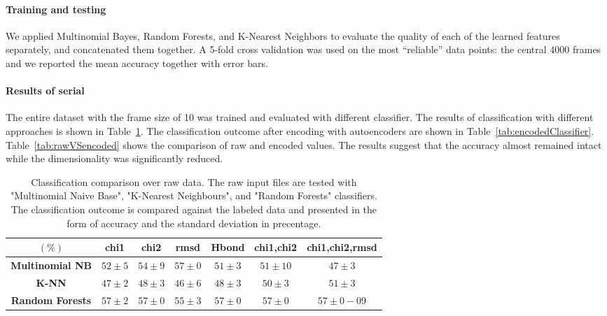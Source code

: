 \documentclass{article}
\begin{document}
\paragraph{Training and testing} We applied Multinomial Bayes, Random Forests, and K-Nearest Neighbors to evaluate the quality of each of the learned features separately, and concatenated them together. A 5-fold cross validation was used on the most “reliable” data points: the central $4000$ frames and we reported the mean accuracy together with error bars.

\paragraph{Results of serial} The entire dataset with the frame size of 10 was trained and evaluated with different classifier. The results of classification with different approaches is shown in Table~\ref{tab:rawClassifier}. The classification outcome after encoding with autoencoders are shown in Table~\ref{tab:encodedClassifier}. Table~\ref{tab:rawVSencoded} shows the comparison of raw and encoded values. The results suggest that the accuracy almost remained intact while the dimensionality was significantly reduced. \\

\begin{table}
\begin{center}
\begin{tabular}{|c|c|c|c|c|c|c|}
\hline
 $(\%)$ &\textbf{chi1} & \textbf{chi2} & \textbf{rmsd} & \textbf{Hbond}& \textbf{chi1,chi2} & \textbf{chi1,chi2,rmsd} \\
\hline\hline
\textbf{Multinomial NB} & $52 \pm 5 $  & $54 \pm 9$ & $57 \pm 0$ & $51 \pm 3 $ & $51 \pm 10 $ & $47 \pm 3$\\
\hline
\textbf{K-NN} & $47 \pm 2 $ & $48 \pm 3 $ & $46 \pm 6 $ & $48 \pm 3$ & $50 \pm 3 $ & $51 \pm 3 $\\
\hline
\textbf{Random Forests} & $57 \pm 2$ & $57 \pm 0 $ & $55 \pm 3$ & $ 57 \pm 0 $ & $57 \pm 0$ & $57 \pm 0 -09$\\
\hline
\end{tabular}
\caption{Classification comparison over raw data. The raw input files are tested with "Multinomial Naive Base", "K-Nearest Neighbours", and "Random Forests" classifiers. The classification outcome is compared against the labeled data and presented in the form of accuracy and the standard deviation in precentage. \label{tab:rawClassifier}}
\end{center}
\end{table}
\end{document}
